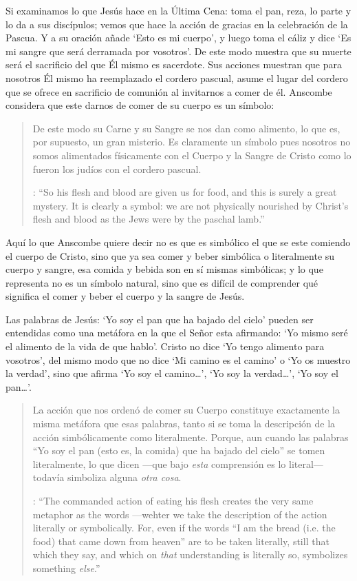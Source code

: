 Si examinamos lo que Jesús hace en la Última Cena: toma el pan, reza, lo parte y lo da a sus discípulos; vemos que hace la acción de gracias en la celebración de la Pascua. Y a su oración añade \enquote*{Esto es mi cuerpo}, y luego toma el cáliz y dice \enquote*{Es mi sangre que será derramada por vosotros}. De este modo muestra que su muerte será el sacrificio del que Él mismo es sacerdote. Sus acciones muestran que para nosotros Él mismo ha reemplazado el cordero pascual, asume el lugar del cordero que se ofrece en sacrificio de comunión al invitarnos a comer de él. Anscombe considera que este darnos de comer de su cuerpo es un símbolo: \blockquote[{\cite[110]{anscombe1981erp:ot}}: \enquote{So his flesh and blood are given us for food, and this is surely a great mystery. It is clearly a symbol: we are not physically nourished by Christ's flesh and blood as the Jews were by the paschal lamb.}]{De este modo su Carne y su Sangre se nos dan como alimento, lo que es, por supuesto, un gran misterio. Es claramente un símbolo pues nosotros no somos alimentados físicamente con el Cuerpo y la Sangre de Cristo como lo fueron los judíos con el cordero pascual.} Aquí lo que Anscombe quiere decir no es que es simbólico el que se este comiendo el cuerpo de Cristo, sino que ya sea comer y beber simbólica o literalmente su cuerpo y sangre, esa comida y bebida son en sí mismas simbólicas; y lo que representa no es un símbolo natural, sino que es difícil de comprender qué significa el comer y beber el cuerpo y la sangre de Jesús.

Las palabras de Jesús: \enquote*{Yo soy el pan que ha bajado del cielo} pueden ser entendidas como una metáfora en la que el Señor esta afirmando: \enquote*{Yo mismo seré el alimento de la vida de que hablo}. Cristo no dice \enquote*{Yo tengo alimento para vosotros}, del mismo modo que no dice \enquote*{Mi camino es el camino} o \enquote*{Yo os muestro la verdad}, sino que afirma \enquote*{Yo soy el camino\ldots}, \enquote*{Yo soy la verdad\ldots}, \enquote*{Yo soy el pan\ldots}. \blockquote[{\cite[110]{anscombe1981erp:ot}}: \enquote{The commanded action of eating his flesh creates the very same metaphor as the words ---wehter we take the description of the action literally or symbolically. For, even if the words ``I am the bread (i.e. the food) that came down from heaven'' are to be taken literally, still that which they say, and which on \emph{that} understanding is literally so, symbolizes something \emph{else}.}]{La acción que nos ordenó de comer su Cuerpo constituye exactamente la misma metáfora que esas palabras, tanto si se toma la descripción de la acción simbólicamente como literalmente. Porque, aun cuando las palabras ``Yo soy el pan (esto es, la comida) que ha bajado del cielo'' se tomen literalmente, lo que dicen ---que bajo \emph{esta} comprensión es lo literal--- todavía simboliza alguna \emph{otra cosa}.}

